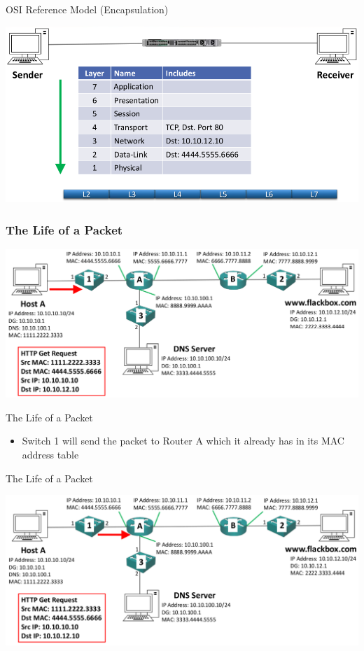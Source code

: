 \documentclass[pdflatex,compress,mathserif]{beamer}
\begin{document}
\begin{frame}{OSI Reference Model (Encapsulation)}
	\begin{center}
		\includegraphics[width=\linewidth]{img/img43}
	\end{center}
\end{frame}

\begin{frame}
	\frametitle{The Life of a Packet}
	\begin{center}
		\includegraphics[width=\linewidth]{img/img44}
	\end{center}
\end{frame}

\begin{frame}{The Life of a Packet}
	\begin{itemize}
		\item Switch 1 will send the packet to Router A which it already has in its MAC address table
	\end{itemize}
\end{frame}

\begin{frame}{The Life of a Packet}
	\begin{center}
		\includegraphics[width=\linewidth]{img/img45}
	\end{center}
\end{frame}
\end{document}
